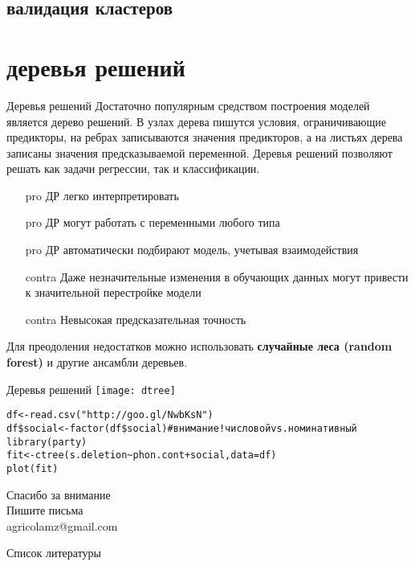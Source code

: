 \subsection{валидация кластеров}
\section{деревья решений}
\begin{frame}{Деревья решений}
Достаточно популярным средством построения моделей является дерево решений. В узлах дерева пишутся условия, ограничивающие предикторы, на ребрах записываются значения предикторов, а на листьях дерева записаны значения предсказываемой переменной. Деревья решений позволяют решать как задачи регрессии, так и классификации.
\vspace{-3mm}
\begin{multicols}{2}
\begin{itemize}
\item[pro]  ДР легко интерпретировать
\item[pro] ДР могут работать с переменными любого типа
\item[pro] ДР автоматически подбирают модель, учетывая взаимодействия
\columnbreak
\item[contra] Даже незначительные изменения в обучающих данных могут привести к значительной перестройке модели
\item[contra] Невысокая предсказательная точность
\end{itemize}
\end{multicols}
Для преодоления недостатков можно использовать \textbf{случайные леса (random forest)} и другие ансамбли деревьев.
\end{frame}
\begin{frame}{Деревья решений}
\texttt{[image: dtree]}\\
\scriptsize
\begin{alltt}
df <- read.csv("http://goo.gl/NwbKsN") \\
df\$social <- \alert{factor(df\$social) \hfill \# внимание! числовой vs. номинативный}\medskip\\
\alert{library(party)} \\
fit <- \alert{ctree(}s.deletion\textasciitilde phon.cont+social, data=df\alert{)}\\
plot(fit)
\end{alltt}
\normalsize
\end{frame}
\begin{frame}
{\huge Спасибо за внимание\bigskip\\
\normalsize Пишите письма\\
agricolamz@gmail.com
\vspace{-130pt}}
\end{frame}
\begin{frame}{Список литературы}
\footnotesize


\end{frame}
